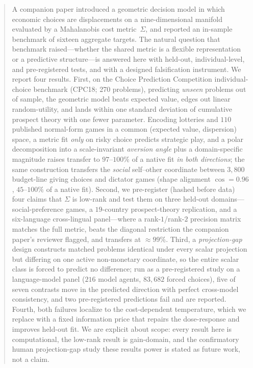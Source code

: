 \documentclass[journal]{IEEEtran}
\begin{document}
\begin{abstract}
A companion paper introduced a geometric decision model in which economic choices are displacements on a nine-dimensional manifold evaluated by a Mahalanobis cost metric~$\Sigma$, and reported an in-sample benchmark of sixteen aggregate targets.
The natural question that benchmark raised---whether the shared metric is a flexible representation or a predictive structure---is answered here with held-out, individual-level, and pre-registered tests, and with a designed falsification instrument.
We report four results.
First, on the Choice Prediction Competition individual-choice benchmark (CPC18; 270 problems), predicting \emph{unseen} problems out of sample, the geometric model beats expected value, edges out linear random-utility, and lands within one standard deviation of cumulative prospect theory with one fewer parameter.
Encoding lotteries and $110$ published normal-form games in a common (expected value, dispersion) space, a metric fit \emph{only} on risky choice predicts strategic play, and a polar decomposition into a scale-invariant \emph{aversion angle} plus a domain-specific magnitude raises transfer to $97$--$100\%$ of a native fit \emph{in both directions}; the same construction transfers the \emph{social} self--other coordinate between $3{,}800$ budget-line giving choices and dictator games (shape alignment $\cos=0.96$, $45$--$100\%$ of a native fit).
Second, we pre-register (hashed before data) four claims that $\Sigma$ is low-rank and test them on three held-out domains---social-preference games, a $19$-country prospect-theory replication, and a six-language cross-lingual panel---where a rank-$1$/rank-$2$ precision matrix matches the full metric, beats the diagonal restriction the companion paper's reviewer flagged, and transfers at $\approx99\%$.
Third, a \emph{projection-gap} design constructs matched problems identical under every scalar projection but differing on one active non-monetary coordinate, so the entire scalar class is forced to predict no difference; run as a pre-registered study on a language-model panel ($216$ model agents, $83{,}682$ forced choices), five of seven contrasts move in the predicted direction with perfect cross-model consistency, and two pre-registered predictions fail and are reported.
Fourth, both failures localize to the cost-dependent temperature, which we replace with a fixed information price that repairs the dose-response and improves held-out fit.
We are explicit about scope: every result here is computational, the low-rank result is gain-domain, and the confirmatory human projection-gap study these results power is stated as future work, not a claim.
\end{abstract}
\end{document}
